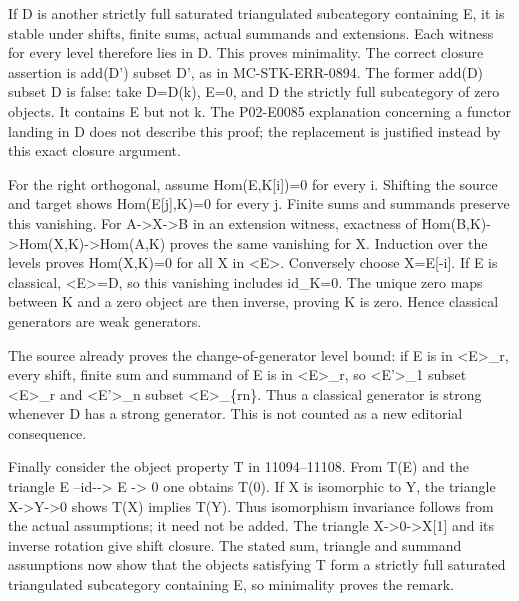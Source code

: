 \documentclass[11pt]{article}
\begin{document}
If D\textquotesingle{} is another strictly full saturated triangulated subcategory containing E,\allowbreak{} it is stable under shifts,\allowbreak{} finite sums,\allowbreak{} actual summands and extensions. Each witness for every level therefore lies in D\textquotesingle. This proves minimality. The correct closure assertion is add(D')\allowbreak{} subset D',\allowbreak{} as in MC-STK-ERR-0894. The former add(D)\allowbreak{} subset D\textquotesingle{} is false:\allowbreak{} take D\allowbreak{}=D(k)\allowbreak{},\allowbreak{} E\allowbreak{}=0,\allowbreak{} and D\textquotesingle{} the strictly full subcategory of zero objects. It contains E but not k. The P02-E0085 explanation concerning a functor landing in D\textquotesingle{} does not describe this proof; the replacement is justified instead by this exact closure argument.

For the right orthogonal,\allowbreak{} assume Hom(E,\allowbreak{}K[i]\allowbreak{})\allowbreak{}\allowbreak{}=0 for every i. Shifting the source and target shows Hom(E[j]\allowbreak{},\allowbreak{}K)\allowbreak{}\allowbreak{}=0 for every j. Finite sums and summands preserve this vanishing. For A\allowbreak{}->X\allowbreak{}->B in an extension witness,\allowbreak{} exactness of Hom(B,\allowbreak{}K)\allowbreak{}\allowbreak{}->Hom(X,\allowbreak{}K)\allowbreak{}\allowbreak{}->Hom(A,\allowbreak{}K)\allowbreak{} proves the same vanishing for X. Induction over the levels proves Hom(X,\allowbreak{}K)\allowbreak{}\allowbreak{}=0 for all X in \textless E\textgreater. Conversely choose X\allowbreak{}=E[-i]\allowbreak{}. If E is classical,\allowbreak{} <E>\allowbreak{}=D,\allowbreak{} so this vanishing includes id\_\allowbreak{}K\allowbreak{}=0. The unique zero maps between K and a zero object are then inverse,\allowbreak{} proving K is zero. Hence classical generators are weak generators.

The source already proves the change-of-generator level bound:\allowbreak{} if E\textquotesingle{} is in <E>\_\allowbreak{}r,\allowbreak{} every shift,\allowbreak{} finite sum and summand of E\textquotesingle{} is in <E>\_\allowbreak{}r,\allowbreak{} so <E'>\_\allowbreak{}1 subset <E>\_\allowbreak{}r and <E'>\_\allowbreak{}n subset <E>\_\allowbreak{}\{rn\}. Thus a classical generator is strong whenever D has a strong generator. This is not counted as a new editorial consequence.

Finally consider the object property T in 11094–\allowbreak{}11108. From T(E)\allowbreak{} and the triangle E --id-\allowbreak{}-> E \allowbreak{}-> 0 one obtains T(0)\allowbreak{}. If X is isomorphic to Y,\allowbreak{} the triangle X\allowbreak{}->Y\allowbreak{}->0 shows T(X)\allowbreak{} implies T(Y)\allowbreak{}. Thus isomorphism invariance follows from the actual assumptions; it need not be added. The triangle X\allowbreak{}->0\allowbreak{}->X[1]\allowbreak{} and its inverse rotation give shift closure. The stated sum,\allowbreak{} triangle and summand assumptions now show that the objects satisfying T form a strictly full saturated triangulated subcategory containing E,\allowbreak{} so minimality proves the remark.
\end{document}
